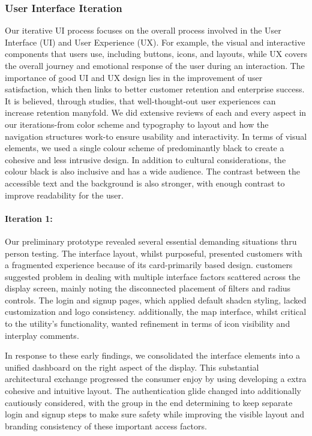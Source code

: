 \subsubsection{User Interface Iteration}
Our iterative UI process focuses on the overall process involved in the User Interface (UI) and User Experience (UX). For example, the visual and interactive components that users use, including buttons, icons, and layouts, while UX covers the overall journey and emotional response of the user during an interaction. The importance of good UI and UX design lies in the improvement of user satisfaction, which then links to better customer retention and enterprise success. It is believed, through studies, that well-thought-out user experiences can increase retention manyfold.\cite{psycray2023} We did extensive reviews of each and every aspect in our iterations-from color scheme and typography to layout and how the navigation structures work-to ensure usability and interactivity. In terms of visual elements, we used a single colour scheme of predominantly black to create a cohesive and less intrusive design. In addition to cultural considerations, the colour black is also inclusive and has a wide audience. The contrast between the accessible text and the background is also stronger, with enough contrast to improve readability for the user.

\paragraph{Iteration 1:}

Our preliminary prototype revealed several essential demanding situations thru person testing. The interface layout, whilst purposeful, presented customers with a fragmented experience because of its card-primarily based design. customers suggested problem in dealing with multiple interface factors scattered across the display screen, mainly noting the disconnected placement of filters and radius controls. The login and signup pages, which applied default shadcn styling, lacked customization and logo consistency. additionally, the map interface, whilst critical to the utility's functionality, wanted refinement in terms of icon visibility and interplay comments.

In response to these early findings, we consolidated the interface elements into a unified dashboard on the right aspect of the display. This substantial architectural exchange progressed the consumer enjoy by using developing a extra cohesive and intuitive layout. The authentication glide changed into additionally cautiously considered, with the group in the end determining to keep separate login and signup steps to make sure safety while improving the visible layout and branding consistency of these important access factors.


